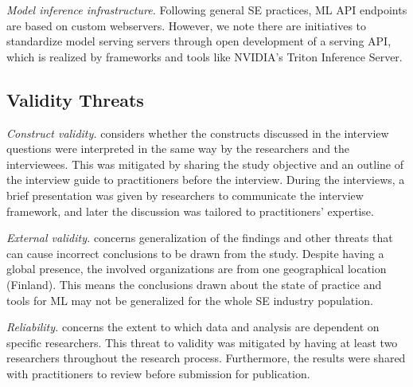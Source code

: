 

\textit{Model inference infrastructure.} Following general SE practices, ML API endpoints are based on custom webservers. However, we note there are initiatives to standardize model serving servers through open development of a serving API, which is realized by frameworks and tools like NVIDIA's Triton Inference Server.


\subsection{Validity Threats}

\textit{Construct validity.} considers whether the constructs discussed in the interview questions were interpreted in the same way by the researchers and the interviewees. This was mitigated by sharing the study objective and an outline of the interview guide to practitioners before the interview. During the interviews, a brief presentation was given by researchers to communicate the interview framework, and later the discussion was tailored to practitioners' expertise.


\textit{External validity.} concerns generalization of the findings and other threats that can cause incorrect conclusions to be drawn from the study. Despite having a global presence, the involved organizations are from one geographical location (Finland). This means the conclusions drawn about the state of practice and tools for ML may not be generalized for the whole SE industry population. 

\textit{Reliability.} concerns the extent to which data and analysis are dependent on specific researchers. This threat to validity was mitigated by having at least two researchers throughout the research process. Furthermore, the results were shared with practitioners to review before submission for publication.


